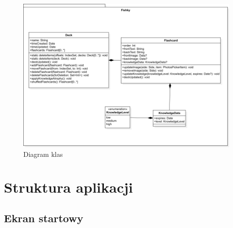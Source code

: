 \documentclass[final,a4paper,openany,12pt]{mwbk}
\begin{document}
\begin{figure}[H]
    \centering
    \includegraphics[width=1.0\textwidth]{img/ClassDiagram1.png}
    \caption{Diagram klas}
    \label{fig:ClassDiagram1}
\end{figure}


\chapter{Struktura aplikacji}

\section{Ekran startowy}
\end{document}
